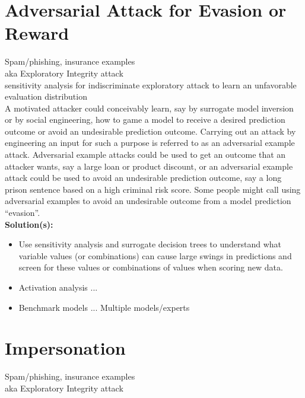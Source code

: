 \documentclass[fleqn]{article}
\begin{document}
\section{Adversarial Attack for Evasion or Reward}

Spam/phishing, insurance examples\\
 
aka Exploratory Integrity attack\\

sensitivity analysis for indiscriminate exploratory attack to learn an unfavorable evaluation distribution\\

A motivated attacker could conceivably learn, say by surrogate model inversion or by social engineering, how to game a model to receive a desired prediction outcome or avoid an undesirable prediction outcome. Carrying out an attack by engineering an input for such a purpose is referred to as an adversarial example attack. Adversarial example attacks could be used to get an outcome that an attacker wants, say a large loan or product discount, or an adversarial example attack could be used to avoid an undesirable prediction outcome, say a long prison sentence based on a high criminal risk score. Some people might call using adversarial examples to avoid an undesirable outcome from a model prediction ``evasion''.\\

\noindent\textbf{Solution(s):} 
\begin{itemize}
\item Use sensitivity analysis and surrogate decision trees to understand what variable values (or combinations) can cause large swings in predictions and screen for these values or combinations of values when scoring new data.
\item Activation analysis ...
\item Benchmark models ... Multiple models/experts
\end{itemize}

\section{Impersonation} \label{sec:impersonation}

Spam/phishing, insurance examples\\

aka Exploratory Integrity attack\\
\end{document}
